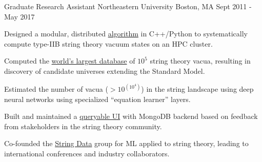 \begin{cventries}
  \cventry
    {Graduate Research Assistant} %
    {Northeastern University} %
    {Boston, MA} %
    {Sept 2011 - May 2017} %
    {
      \begin{cvitems} %
        \item {Designed a modular, distributed \href{http://github.com/knowbodynos/stringmods}{algorithm} in C++/Python to systematically compute type-IIB string theory vacuum states on an HPC cluster.}
		\item {Computed the \href{https://app.box.com/s/ch4w5gy1wv9dv11ptf314u7ovj2x4vig}{world's largest database} of $10^5$ string theory vacua, resulting in discovery of candidate universes extending the Standard Model.} %
		\item {Estimated the number of vacua ($>10^{(10^{4})}$) in the string landscape using deep neural networks using specialized ``equation learner'' layers.}
		\item \item {Built and maintained a \href{http://www.rossealtman.com/toriccy/}{queryable UI} with MongoDB backend based on feedback from stakeholders in the string theory community.}
		\item {Co-founded the \href{https://web.northeastern.edu/het/string\_data/}{String Data} group for ML applied to string theory, leading to international conferences and industry collaborators.}
      \end{cvitems}
    }


\end{cventries}
